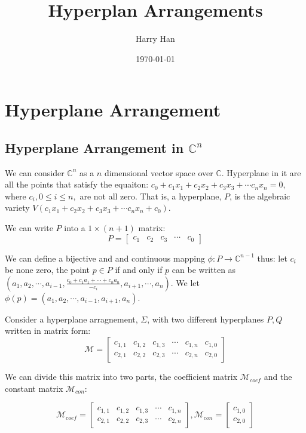 \documentclass[12pt, a4paper]{article}
\title{Hyperplan Arrangements}
\author{Harry Han}
\date{\today}
\theoremstyle{definition}
\theoremstyle{remark}
\newcommand{\bb}[1]{\mathbb{#1}}
\begin{document}
\maketitle
\section{Hyperplane Arrangement}

\subsection{Hyperplane Arrangement in $\bb{C}^n$}

We can consider $\bb{C}^n$ as a $n$ dimensional vector space over $\bb{C}$. 
Hyperplane in it are all the points that satisfy the equaiton: $c_0 + c_1x_1 + c_2x_2 + c_3x_3 + \cdots c_nx_n = 0$, where $c_i, 0 \leq i \leq n, $ are not all zero.
That is, a hyperplane, $P$, is the algebraic variety $V(c_1x_1 + c_2x_2 + c_3x_3 + \cdots c_nx_n + c_0)$. 

We can write $P$ into a $1\times (n+1)$ matrix: 
$$
P = 
\begin{bmatrix}
	c_1 & c_2 & c_3 & \cdots & c_0
\end{bmatrix}
$$

We can define a bijective and and continuous  mapping $\phi: P \rightarrow  \bb{C}^{n-1}$ thus:
let $c_i$ be none zero, the point $p \in P$ if and only if $p$ can be written as 
\\
$(a_1, a_2, \cdots, a_{i-1}, \frac{c_0 + c_1a_1 + \cdots + c_na_n}{-c_i}, a_{i+1}, \cdots, a_n)$.
We let  
\\
$\phi(p) = (a_1, a_2, \cdots, a_{i-1}, a_{i+1}, a_n)$.

Consider a hyperplane arragnement, $\Sigma$, with two different hyperplanes $P, Q$ written in matrix form:
$$
\mathcal{M} = 
\begin{bmatrix}
	c_{1,1} & c_{1,2} & c_{1,3} & \cdots & c_{1,n} & c_{1,0} \\
	c_{2,1} & c_{2,2} & c_{2,3} & \cdots & c_{2,n} & c_{2,0}
\end{bmatrix}
$$

We can divide this matrix into two parts, the coefficient matrix $\mathcal{M}_{coef}$ and the constant matrix $\mathcal{M}_{con}$:

$$
\mathcal{M}_{coef} =
\begin{bmatrix}
	c_{1,1} & c_{1,2} & c_{1,3} & \cdots & c_{1,n} \\
	c_{2,1} & c_{2,2} & c_{2,3} & \cdots & c_{2,n}
\end{bmatrix}
,
\mathcal{M}_{con} =
\begin{bmatrix}
	c_{1,0} \\
	c_{2,0}
\end{bmatrix}
$$
\end{document}

